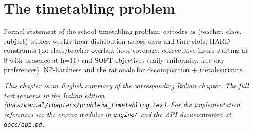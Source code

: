 \chapter{The timetabling problem}
\label{ch:problema_timetabling_en}

Formal statement of the school timetabling problem: cattedre as (teacher, class, subject) triples; weekly hour distribution across days and time slots; HARD constraints (no class/teacher overlap, hour coverage, consecutive hours starting at 8 with presence at h=11) and SOFT objectives (daily uniformity, free-day preferences). NP-hardness and the rationale for decomposition + metaheuristics.

\medskip
\noindent
\textit{This chapter is an English summary of the corresponding Italian chapter. The full text remains in the Italian edition (\texttt{docs/manual/chapters/problema\_timetabling.tex}). For the implementation references see the engine modules in \texttt{engine/} and the API documentation at \texttt{docs/api.md}.}
